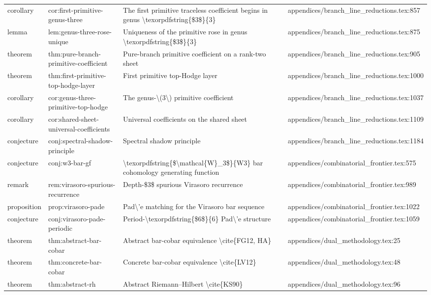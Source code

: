 \documentclass[11pt]{article}
\begin{document}
\begin{longtable}{L{0.10\textwidth}L{0.26\textwidth}L{0.42\textwidth}L{0.22\textwidth}}
corollary & cor:first-primitive-genus-three & The first primitive traceless coefficient begins in genus \textbackslash{}texorpdfstring\{\$3\$\}\{3\} & appendices/branch\_line\_reductions.tex:857\\
lemma & lem:genus-three-rose-unique & Uniqueness of the primitive rose in genus \textbackslash{}texorpdfstring\{\$3\$\}\{3\} & appendices/branch\_line\_reductions.tex:875\\
theorem & thm:pure-branch-primitive-coefficient & Pure-branch primitive coefficient on a rank-two sheet & appendices/branch\_line\_reductions.tex:905\\
theorem & thm:first-primitive-top-hodge-layer & First primitive top-Hodge layer & appendices/branch\_line\_reductions.tex:1000\\
corollary & cor:genus-three-primitive-top-hodge & The genus-\textbackslash{}(3\textbackslash{}) primitive coefficient & appendices/branch\_line\_reductions.tex:1037\\
corollary & cor:shared-sheet-universal-coefficients & Universal coefficients on the shared sheet & appendices/branch\_line\_reductions.tex:1109\\
conjecture & conj:spectral-shadow-principle & Spectral shadow principle & appendices/branch\_line\_reductions.tex:1184\\
conjecture & conj:w3-bar-gf & \textbackslash{}texorpdfstring\{\$\textbackslash{}mathcal\{W\}\_3\$\}\{W3\} bar cohomology generating function & appendices/combinatorial\_frontier.tex:575\\
remark & rem:virasoro-spurious-recurrence & Depth-\$3\$ spurious Virasoro recurrence & appendices/combinatorial\_frontier.tex:989\\
proposition & prop:virasoro-pade & Pad\textbackslash{}'e matching for the Virasoro bar sequence & appendices/combinatorial\_frontier.tex:1022\\
conjecture & conj:virasoro-pade-periodic & Period-\textbackslash{}texorpdfstring\{\$6\$\}\{6\} Pad\textbackslash{}'e structure & appendices/combinatorial\_frontier.tex:1059\\
theorem & thm:abstract-bar-cobar & Abstract bar-cobar equivalence \textbackslash{}cite\{FG12, HA\} & appendices/dual\_methodology.tex:25\\
theorem & thm:concrete-bar-cobar & Concrete bar-cobar equivalence \textbackslash{}cite\{LV12\} & appendices/dual\_methodology.tex:48\\
theorem & thm:abstract-rh & Abstract Riemann--Hilbert \textbackslash{}cite\{KS90\} & appendices/dual\_methodology.tex:96\\

\end{longtable}
\end{document}
